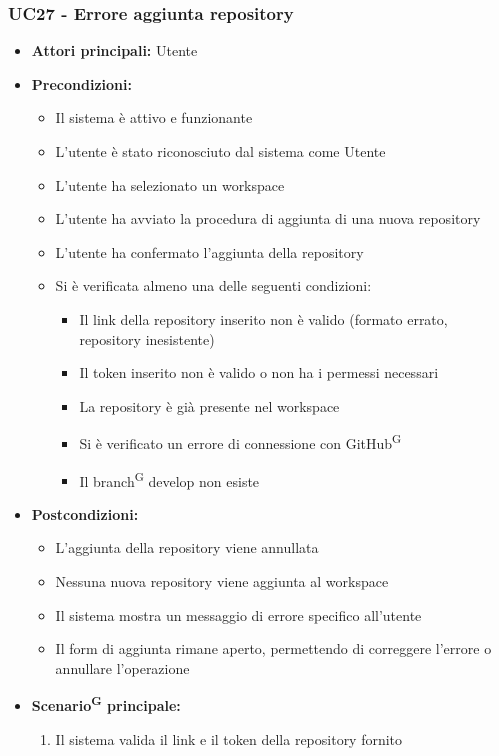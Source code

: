 \documentclass[a4paper, 11pt]{article}
\begin{document}
\subsubsection{UC27 - Errore aggiunta repository}\label{UC27}
\begin{itemize}
	\item \textbf{Attori principali:} Utente
	\item \textbf{Precondizioni:} 
	\begin{itemize}
		\item Il sistema è attivo e funzionante
		\item L'utente è stato riconosciuto dal sistema come Utente
		\item L'utente ha selezionato un workspace
		\item L'utente ha avviato la procedura di aggiunta di una nuova repository
		\item L'utente ha confermato l'aggiunta della repository
		\item Si è verificata almeno una delle seguenti condizioni:
		\begin{itemize}
			\item Il link della repository inserito non è valido (formato errato, repository inesistente)
			\item Il token inserito non è valido o non ha i permessi necessari
			\item La repository è già presente nel workspace
			\item Si è verificato un errore di connessione con GitHub\textsuperscript{G}
			\item Il branch\textsuperscript{G} develop non esiste
		\end{itemize}
	\end{itemize}
	\item \textbf{Postcondizioni:} 
	\begin{itemize}
		\item L'aggiunta della repository viene annullata
		\item Nessuna nuova repository viene aggiunta al workspace
		\item Il sistema mostra un messaggio di errore specifico all'utente
		\item Il form di aggiunta rimane aperto, permettendo di correggere l'errore o annullare l'operazione
	\end{itemize}
	\item \textbf{Scenario\textsuperscript{G} principale:}
	\begin{enumerate}
		\item Il sistema valida il link e il token della repository fornito

\end{enumerate}
\end{itemize}
\end{document}
